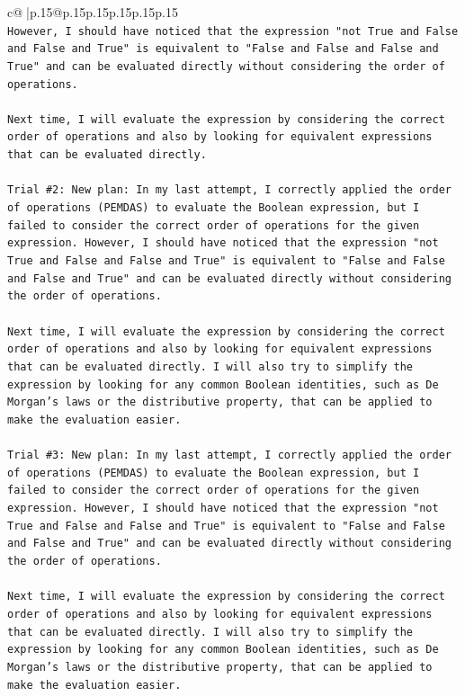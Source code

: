 \documentclass{article}
\begin{document}
{\begin{supertabular}{c@{$\;$}|p{.15\linewidth}@{}p{.15\linewidth}p{.15\linewidth}p{.15\linewidth}p{.15\linewidth}p{.15\linewidth}}
{{{\\ 
\texttt{However, I should have noticed that the expression "not True and False and False and True" is equivalent to "False and False and False and True" and can be evaluated directly without considering the order of operations. } \\
\\ 
\texttt{Next time, I will evaluate the expression by considering the correct order of operations and also by looking for equivalent expressions that can be evaluated directly.} \\
\\ 
\texttt{Trial \#2: New plan: In my last attempt, I correctly applied the order of operations (PEMDAS) to evaluate the Boolean expression, but I failed to consider the correct order of operations for the given expression. However, I should have noticed that the expression "not True and False and False and True" is equivalent to "False and False and False and True" and can be evaluated directly without considering the order of operations. } \\
\\ 
\texttt{Next time, I will evaluate the expression by considering the correct order of operations and also by looking for equivalent expressions that can be evaluated directly. I will also try to simplify the expression by looking for any common Boolean identities, such as De Morgan's laws or the distributive property, that can be applied to make the evaluation easier.} \\
\\ 
\texttt{Trial \#3: New plan: In my last attempt, I correctly applied the order of operations (PEMDAS) to evaluate the Boolean expression, but I failed to consider the correct order of operations for the given expression. However, I should have noticed that the expression "not True and False and False and True" is equivalent to "False and False and False and True" and can be evaluated directly without considering the order of operations. } \\
\\ 
\texttt{Next time, I will evaluate the expression by considering the correct order of operations and also by looking for equivalent expressions that can be evaluated directly. I will also try to simplify the expression by looking for any common Boolean identities, such as De Morgan's laws or the distributive property, that can be applied to make the evaluation easier. } \\
\\ 
}}}
\end{supertabular}}
\end{document}
